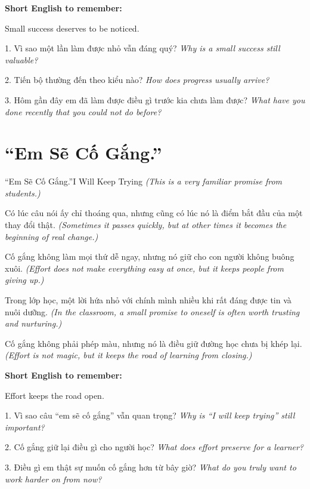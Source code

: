 \begin{ghinhoanh}
\textbf{Short English to remember:}

Small success deserves to be noticed.

\end{ghinhoanh}

\begin{tuhocnhanh}
1. Vì sao một lần làm được nhỏ vẫn đáng quý? \textit{Why is a small success still valuable?}

2. Tiến bộ thường đến theo kiểu nào? \textit{How does progress usually arrive?}

3. Hôm gần đây em đã làm được điều gì trước kia chưa làm được? \textit{What have you done recently that you could not do before?}
\end{tuhocnhanh}
\ngancach

\section{``Em Sẽ Cố Gắng.''}
\begin{truyen}{``Em Sẽ Cố Gắng.''}{I Will Keep Trying}
\textit{(This is a very familiar promise from students.)}

Có lúc câu nói ấy chỉ thoáng qua, nhưng cũng có lúc nó là điểm bắt đầu của một thay đổi thật.
\textit{(Sometimes it passes quickly, but at other times it becomes the beginning of real change.)}

Cố gắng không làm mọi thứ dễ ngay, nhưng nó giữ cho con người không buông xuôi.
\textit{(Effort does not make everything easy at once, but it keeps people from giving up.)}

Trong lớp học, một lời hứa nhỏ với chính mình nhiều khi rất đáng được tin và nuôi dưỡng.
\textit{(In the classroom, a small promise to oneself is often worth trusting and nurturing.)}
\end{truyen}

\begin{baihoc}
Cố gắng không phải phép màu, nhưng nó là điều giữ đường học chưa bị khép lại.
\textit{(Effort is not magic, but it keeps the road of learning from closing.)}
\end{baihoc}

\begin{ghinhoanh}
\textbf{Short English to remember:}

Effort keeps the road open.

\end{ghinhoanh}

\begin{tuhocnhanh}
1. Vì sao câu ``em sẽ cố gắng'' vẫn quan trọng? \textit{Why is ``I will keep trying'' still important?}

2. Cố gắng giữ lại điều gì cho người học? \textit{What does effort preserve for a learner?}

3. Điều gì em thật sự muốn cố gắng hơn từ bây giờ? \textit{What do you truly want to work harder on from now?}
\end{tuhocnhanh}
\ngancach